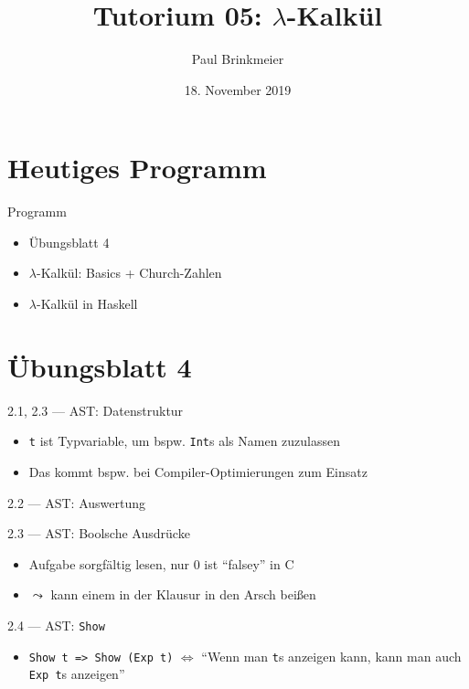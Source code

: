 \documentclass{beamer}
\title{Tutorium 05: $\lambda$-Kalkül}
\author{Paul Brinkmeier}
\institute{Tutorium Programmierparadigmen am KIT}
\date{18. November 2019}
\newcommand{\code}[1]{
	\begin{mdframed}
		
	\end{mdframed}
}
\begin{document}
\begin{frame}
	\titlepage
\end{frame}

\section{Heutiges Programm}
\begin{frame}{Programm}
	\begin{itemize}
		\item Übungsblatt 4
		\item $\lambda$-Kalkül: Basics + Church-Zahlen
		\pause
		\item $\lambda$-Kalkül in Haskell
	\end{itemize}
\end{frame}

\section{Übungsblatt 4}

\begin{frame}{2.1, 2.3 --- AST: Datenstruktur}
	\code{demos/AstType.hs}

	\begin{itemize}
		\item \texttt{t} ist Typvariable, um bspw. \texttt{Int}s als Namen zuzulassen
		\item Das kommt bspw. bei Compiler-Optimierungen zum Einsatz
	\end{itemize}
\end{frame}

\begin{frame}{2.2 --- AST: Auswertung}
	\code{demos/AstEval.hs}
\end{frame}

\begin{frame}{2.3 --- AST: Boolsche Ausdrücke}
	\code{demos/AstEval2.hs}

	\begin{itemize}
		\item Aufgabe sorgfältig lesen, nur 0 ist \enquote{falsey} in C
		\item $\leadsto$ kann einem in der Klausur in den Arsch beißen
	\end{itemize}
\end{frame}

\begin{frame}{2.4 --- AST: \texttt{Show}}
	\code{demos/AstShow.hs}

	\begin{itemize}
		\item \texttt{Show t => Show (Exp t)} $\Leftrightarrow$ \enquote{Wenn man \texttt{t}s anzeigen kann, kann man auch \texttt{Exp t}s anzeigen}
	\end{itemize}
\end{frame}
\end{document}

